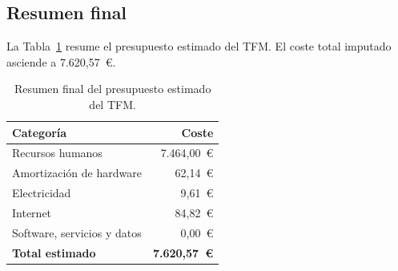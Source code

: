 \subsection*{Resumen final}

La Tabla~\ref{tab:presupuesto-resumen} resume el presupuesto estimado del TFM. El coste total imputado asciende a 7.620,57~\euro{}.

\begin{table}[H]
    \centering
    \begin{tabular}{lr}
        \hline
        \textbf{Categoría} & \textbf{Coste} \\
        \hline
        Recursos humanos & 7.464,00~\euro{} \\
        Amortización de hardware & 62,14~\euro{} \\
        Electricidad & 9,61~\euro{} \\
        Internet & 84,82~\euro{} \\
        Software, servicios y datos & 0,00~\euro{} \\
        \hline
        \textbf{Total estimado} & \textbf{7.620,57~\euro{}} \\
        \hline
    \end{tabular}
    \caption{Resumen final del presupuesto estimado del TFM.}
    \label{tab:presupuesto-resumen}
\end{table}

